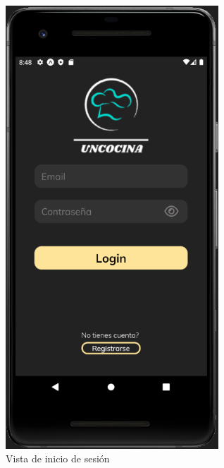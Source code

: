 \begin{figure}[!h]
  \centering
  \includegraphics[width=8cm, scale=1]{Images/Imagenes/login1.png}
  \caption{Vista de inicio de sesión}
  \label{fig:login1}
\end{figure}

